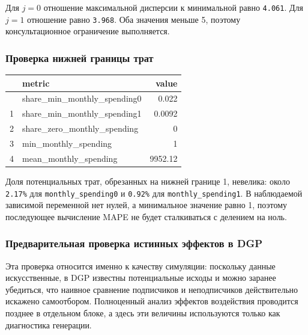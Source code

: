 \documentclass[11pt]{article}
\newcounter{none}
\begin{document}
Для \(j=0\) отношение максимальной дисперсии к минимальной равно
\texttt{4.061}. Для \(j=1\) отношение равно \texttt{3.968}. Оба значения
меньше 5, поэтому консультационное ограничение выполняется.

\subsubsection{Проверка нижней границы
трат}\label{ux43fux440ux43eux432ux435ux440ux43aux430-ux43dux438ux436ux43dux435ux439-ux433ux440ux430ux43dux438ux446ux44b-ux442ux440ux430ux442}

{\def\LTcaptype{none} %
\begin{longtable}[]{@{}rlr@{}}
\toprule\noalign{}
& metric & value \\
\midrule\noalign{}
\endhead
\bottomrule\noalign{}
\endlastfoot
0 & share\_min\_monthly\_spending0 & 0.022 \\
1 & share\_min\_monthly\_spending1 & 0.0092 \\
2 & share\_zero\_monthly\_spending & 0 \\
3 & min\_monthly\_spending & 1 \\
4 & mean\_monthly\_spending & 9952.12 \\
\end{longtable}
}

Доля потенциальных трат, обрезанных на нижней границе 1, невелика: около
\texttt{2.17\%} для \texttt{monthly\_spending0} и \texttt{0.92\%} для
\texttt{monthly\_spending1}. В наблюдаемой зависимой переменной нет
нулей, а минимальное значение равно 1, поэтому последующее вычисление
MAPE не будет сталкиваться с делением на ноль.

\subsubsection{Предварительная проверка истинных эффектов в
DGP}\label{ux43fux440ux435ux434ux432ux430ux440ux438ux442ux435ux43bux44cux43dux430ux44f-ux43fux440ux43eux432ux435ux440ux43aux430-ux438ux441ux442ux438ux43dux43dux44bux445-ux44dux444ux444ux435ux43aux442ux43eux432-ux432-dgp}

Эта проверка относится именно к качеству симуляции: поскольку данные
искусственные, в DGP известны потенциальные исходы и можно заранее
убедиться, что наивное сравнение подписчиков и неподписчиков
действительно искажено самоотбором. Полноценный анализ эффектов
воздействия проводится позднее в отдельном блоке, а здесь эти величины
используются только как диагностика генерации.
\end{document}
